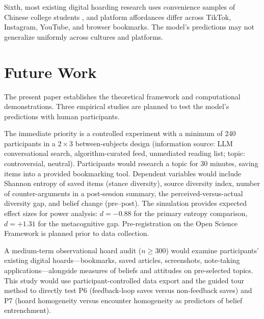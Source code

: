 \documentclass[12pt,a4paper]{article}
\begin{document}
Sixth, most existing digital hoarding research uses convenience samples of Chinese college students \citep{Bai2025,Wang2023,Wu2023,LiuLiu2024}, and platform affordances differ across TikTok, Instagram, YouTube, and browser bookmarks.
The model's predictions may not generalize uniformly across cultures and platforms.



\section{Future Work}

The present paper establishes the theoretical framework and computational demonstrations.
Three empirical studies are planned to test the model's predictions with human participants.

The immediate priority is a controlled experiment with a minimum of 240 participants in a $2 \times 3$ between-subjects design (information source: LLM conversational search, algorithm-curated feed, unmediated reading list; topic: controversial, neutral).
Participants would research a topic for 30 minutes, saving items into a provided bookmarking tool.
Dependent variables would include Shannon entropy of saved items (stance diversity), source diversity index, number of counter-arguments in a post-session summary, the perceived-versus-actual diversity gap, and belief change (pre--post).
The simulation provides expected effect sizes for power analysis: $d = -0.88$ for the primary entropy comparison, $d = +1.31$ for the metacognitive gap.
Pre-registration on the Open Science Framework is planned prior to data collection.

A medium-term observational hoard audit ($n \geq 300$) would examine participants' existing digital hoards---bookmarks, saved articles, screenshots, note-taking applications---alongside measures of beliefs and attitudes on pre-selected topics.
This study would use participant-controlled data export and the guided tour method \citep{Jones2010,Jones2021} to directly test P6 (feedback-loop saves versus non-feedback saves) and P7 (hoard homogeneity versus encounter homogeneity as predictors of belief entrenchment).
\end{document}
